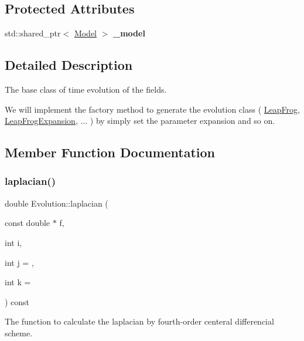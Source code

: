 \subsection*{Protected Attributes}
\begin{DoxyCompactItemize}
\item 
\mbox{\label{class_evolution_aa3dd9e68324ac958960e9b6e600940cf}} 
std\+::shared\+\_\+ptr$<$ \mbox{\hyperlink{class_model}{Model}} $>$ {\bfseries \+\_\+model}
\end{DoxyCompactItemize}


\subsection{Detailed Description}
The base class of time evolution of the fields. 

We will implement the factory method to generate the evolution class ( \mbox{\hyperlink{class_leap_frog}{Leap\+Frog}}, \mbox{\hyperlink{class_leap_frog_expansion}{Leap\+Frog\+Expansion}}, ... ) by simply set the parameter \textquotesingle{}expansion\textquotesingle{} and so on. 

\subsection{Member Function Documentation}
\mbox{\label{class_evolution_af86656987a077304eacaa56100377be3}} 
\subsubsection{\texorpdfstring{laplacian()}{laplacian()}}
{\footnotesize\ttfamily double Evolution\+::laplacian (\begin{DoxyParamCaption}\item[{const double $\ast$}]{f,  }\item[{int}]{i,  }\item[{int}]{j = {},  }\item[{int}]{k = {} }\end{DoxyParamCaption}) const\hspace{0.3cm}{\ttfamily [protected]}}



The function to calculate the laplacian by fourth-\/order centeral differencial scheme. 


